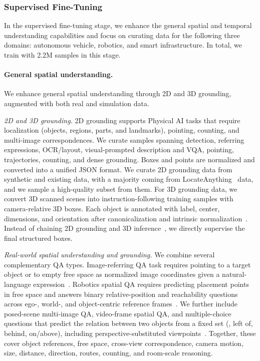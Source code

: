 \subsubsection{Supervised Fine-Tuning}
\label{subsubsec::data_reas_posttrain}

In the supervised fine-tuning stage, we enhance the general spatial and temporal understanding capabilities and focus on curating data for the following three domains: autonomous vehicle, robotics, and smart infrastructure. In total, we train with 2.2M samples in this stage.

\paragraph{General spatial understanding.}
We enhance general spatial understanding through 2D and 3D grounding, augmented with both real and simulation data.

\textit{2D and 3D grounding.} 2D grounding supports Physical AI tasks that require localization (objects, regions, parts, and landmarks), pointing, counting, and multi-image correspondences. We curate samples spanning detection, referring expressions, OCR/layout, visual-prompted description and VQA, pointing, trajectories, counting, and dense grounding. Boxes and points are normalized and converted into a unified JSON format. We curate 2D grounding data from synthetic and existing data, with a majority coming from LocateAnything~\citep{wang2025locateanything} data, and we sample a high-quality subset from them. For 3D grounding data, we convert 3D scanned scenes into instruction-following training samples with camera-relative 3D boxes. Each object is annotated with label, center, dimensions, and orientation after canonicalization and intrinsic normalization~\citep{brazil2023omni3d}. Instead of chaining 2D grounding and 3D inference~\citep{gr3d,man2025locateanything3d}, we directly supervise the final structured boxes.

\textit{Real-world spatial understanding and grounding.} We combine several complementary QA types. Image-referring QA task requires pointing to a target object or to empty free space as normalized image coordinates given a natural-language expression~\citep{zhou2025roborefer}. Robotics spatial QA requires predicting placement points in free space and answers binary relative-position and reachability questions across ego-, world-, and object-centric reference frames~\citep{song2025robospatial}. We further include posed-scene multi-image QA, video-frame spatial QA, and multiple-choice questions that predict the relation between two objects from a fixed set (\eg, left of, behind, on/above), including perspective-substituted viewpoints~\citep{liu-etal-2025-multimodal-large}. Together, these cover object references, free space, cross-view correspondence, camera motion, size, distance, direction, routes, counting, and room-scale reasoning.

